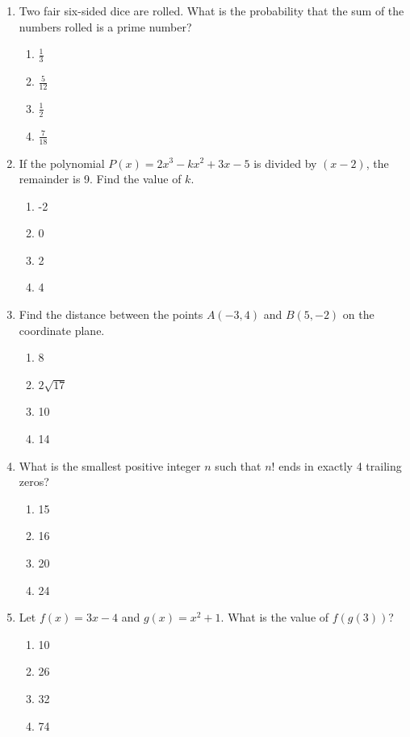 \documentclass[12pt]{scrartcl}
\begin{document}
\begin{enumerate}
    \item Two fair six-sided dice are rolled. What is the probability that the sum of the numbers rolled is a prime number?
    \begin{enumerate}
        \item $\frac{1}{3}$
        \item $\frac{5}{12}$
        \item $\frac{1}{2}$
        \item $\frac{7}{18}$
    \end{enumerate}

    \item If the polynomial $P(x) = 2x^3 - kx^2 + 3x - 5$ is divided by $(x - 2)$, the remainder is 9. Find the value of $k$.
    \begin{enumerate}
        \item -2
        \item 0
        \item 2
        \item 4
    \end{enumerate}

    \item Find the distance between the points $A(-3, 4)$ and $B(5, -2)$ on the coordinate plane.
    \begin{enumerate}
        \item 8
        \item $2\sqrt{17}$
        \item 10
        \item 14
    \end{enumerate}

    \item What is the smallest positive integer $n$ such that $n!$ ends in exactly 4 trailing zeros?
    \begin{enumerate}
        \item 15
        \item 16
        \item 20
        \item 24
    \end{enumerate}

    \item Let $f(x) = 3x - 4$ and $g(x) = x^2 + 1$. What is the value of $f(g(3))$?
    \begin{enumerate}
        \item 10
        \item 26
        \item 32
        \item 74
    \end{enumerate}


\end{enumerate}
\end{document}
